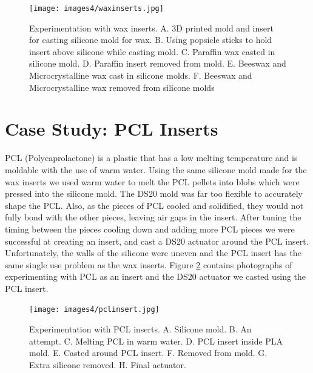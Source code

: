 \begin{figure}[h]
    \centering
    \texttt{[image: images4/waxinserts.jpg]}
    \caption{Experimentation with wax inserts. A. 3D printed mold and insert for casting silicone mold for wax. B. Using popsicle sticks to hold insert above silicone while casting mold. C. Paraffin wax casted in silicone mold. D. Paraffin insert removed from mold. E. Beeswax and Microcrystalline wax cast in silicone molds. F. Beeswax and Microcrystalline wax removed from silicone molds}
    \label{fig:waxinserts}
\end{figure}

\section{Case Study: PCL Inserts}

PCL (Polycaprolactone) is a plastic that has a low melting temperature and is moldable with the use of warm water. Using the same silicone mold made for the wax inserts we used warm water to melt the PCL pellets into blobs which were pressed into the silicone mold. The DS20 mold was far too flexible to accurately shape the PCL. Also, as the pieces of PCL cooled and solidified, they would not fully bond with the other pieces, leaving air gaps in the insert. After tuning the timing between the pieces cooling down and adding more PCL pieces we were successful at creating an insert, and cast a DS20 actuator around the PCL insert. Unfortunately, the walls of the silicone were uneven and the PCL insert has the same single use problem as the wax inserts. Figure \ref{fig:pclinsert} contains photographs of experimenting with PCL as an insert and the DS20 actuator we casted using the PCL insert. 

\begin{figure}[h]
    \centering
    \texttt{[image: images4/pclinsert.jpg]}
    \caption{Experimentation with PCL inserts. A. Silicone mold. B. An attempt. C. Melting PCL in warm water. D. PCL insert inside PLA mold. E. Casted around PCL insert. F. Removed from mold. G. Extra silicone removed. H. Final actuator.}
    \label{fig:pclinsert}
\end{figure}